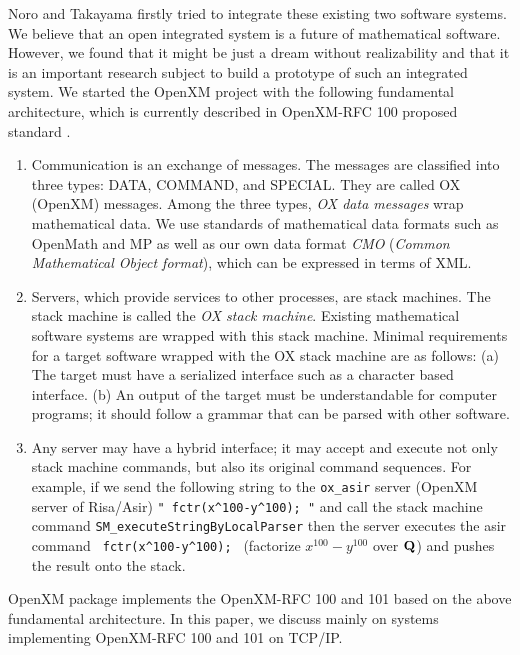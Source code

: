 Noro and Takayama firstly tried to integrate these existing two
software systems.
We believe that an open integrated system is a future of mathematical
software.
However, we found that it might be just a dream without realizability
and that it is an important research subject to
build a prototype of such an integrated system. %
We started the OpenXM project with the following
fundamental architecture, which is currently described in
OpenXM-RFC 100  proposed standard %
\cite{ox-rfc-100}.
\begin{enumerate}
\item Communication is an exchange of messages. The messages are classified into
three types:
DATA, COMMAND, and SPECIAL.
They are called OX (OpenXM) messages.
Among the three types,
{\it OX data messages} wrap mathematical data.
We use standards of mathematical data formats such as OpenMath and MP
as well as our own data format {\it CMO}
({\it Common Mathematical Object format}),
which can be expressed in terms of XML.
\item Servers, which provide services to other processes, are stack machines.
The stack machine is called the
{\it OX stack machine}.
Existing mathematical software systems are wrapped with this stack machine.
Minimal requirements for a target software wrapped with the OX stack machine
are as follows:
(a) The target must have a serialized interface such as a character based
interface.
(b) An output of the target must be understandable for computer programs;
it should follow a grammar that can be parsed with other software.
\item Any server may have a hybrid interface;
it may accept and execute not only stack machine commands, 
but also its original command sequences.
For example,
if we send the following string to the {\tt ox\_asir} server 
(OpenXM server of Risa/Asir) 
\verb+" fctr(x^100-y^100); "+ 
and call the stack machine command 
\verb+SM_executeStringByLocalParser+
then the server executes the asir command 
\verb+ fctr(x^100-y^100); + 
(factorize $x^{100}-y^{100}$ over ${\bf Q}$)
and pushes the result onto the stack.
\end{enumerate}
OpenXM package  implements the OpenXM-RFC 100 \cite{ox-rfc-100}
and 101 \cite{ox-rfc-101} based on
the above fundamental architecture.
In this paper, we discuss mainly on systems implementing
OpenXM-RFC 100 and 101 on TCP/IP.

